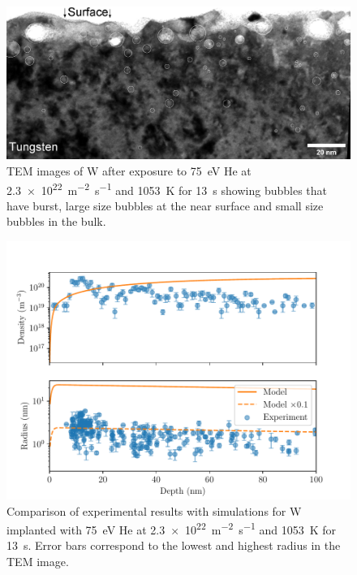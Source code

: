 \begin{figure} [h]
    \centering
    \includegraphics[width=\linewidth]{Figures/Chapter4/bubbles_tem.jpg}
    \caption{TEM images of W after exposure to \SI{75}{eV} He at \SI{2.3e22}{m^{-2}.s^{-1}} and \SI{1053}{K} for \SI{13}{s} showing bubbles that have burst, large size bubbles at the near surface and small size bubbles in the bulk.}
    \label{fig: tem images}
\end{figure}

\begin{figure} [h!]
    \centering
    \includegraphics[width=\linewidth]{Figures/Chapter4/comparison_model_exp.pdf}
    \caption{Comparison of experimental results with simulations for W implanted with \SI{75}{eV} He at \SI{2.3e22}{m^{-2}.s^{-1}} and \SI{1053}{K} for \SI{13}{s}. Error bars correspond to the lowest and highest radius in the TEM image.}
    \label{fig: exp model comparison}
\end{figure}


